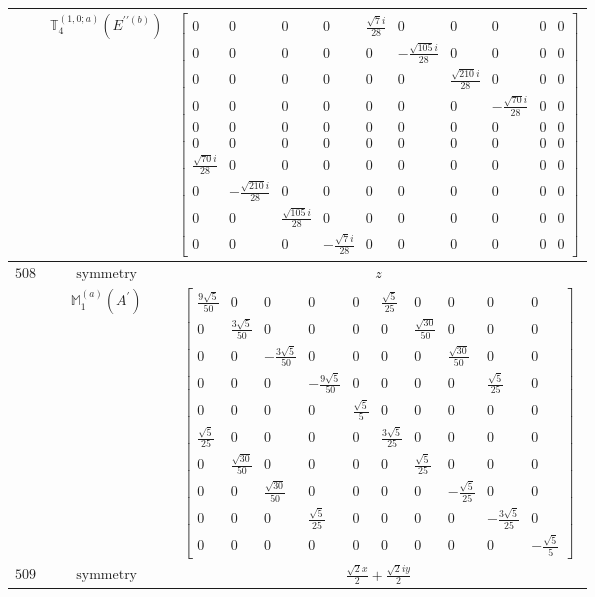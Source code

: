 \documentclass[fleqn,8pt,landscape]{jsarticle}
\begin{document}
\begin{longtable}{ccc}
$  $ & $ \mathbb{T}_{4}^{(1,0;a)}(E^{\prime\prime(b)}) $ & $ \begin{bmatrix} 0 & 0 & 0 & 0 & \frac{\sqrt{7} i}{28} & 0 & 0 & 0 & 0 & 0 \\ 0 & 0 & 0 & 0 & 0 & - \frac{\sqrt{105} i}{28} & 0 & 0 & 0 & 0 \\ 0 & 0 & 0 & 0 & 0 & 0 & \frac{\sqrt{210} i}{28} & 0 & 0 & 0 \\ 0 & 0 & 0 & 0 & 0 & 0 & 0 & - \frac{\sqrt{70} i}{28} & 0 & 0 \\ 0 & 0 & 0 & 0 & 0 & 0 & 0 & 0 & 0 & 0 \\ 0 & 0 & 0 & 0 & 0 & 0 & 0 & 0 & 0 & 0 \\ \frac{\sqrt{70} i}{28} & 0 & 0 & 0 & 0 & 0 & 0 & 0 & 0 & 0 \\ 0 & - \frac{\sqrt{210} i}{28} & 0 & 0 & 0 & 0 & 0 & 0 & 0 & 0 \\ 0 & 0 & \frac{\sqrt{105} i}{28} & 0 & 0 & 0 & 0 & 0 & 0 & 0 \\ 0 & 0 & 0 & - \frac{\sqrt{7} i}{28} & 0 & 0 & 0 & 0 & 0 & 0 \end{bmatrix} $ \\ \hline
$ 508 $ & $ \text{symmetry} $ & $ z $ \\
$  $ & $ \mathbb{M}_{1}^{(a)}(A^{\prime}) $ & $ \begin{bmatrix} \frac{9 \sqrt{5}}{50} & 0 & 0 & 0 & 0 & \frac{\sqrt{5}}{25} & 0 & 0 & 0 & 0 \\ 0 & \frac{3 \sqrt{5}}{50} & 0 & 0 & 0 & 0 & \frac{\sqrt{30}}{50} & 0 & 0 & 0 \\ 0 & 0 & - \frac{3 \sqrt{5}}{50} & 0 & 0 & 0 & 0 & \frac{\sqrt{30}}{50} & 0 & 0 \\ 0 & 0 & 0 & - \frac{9 \sqrt{5}}{50} & 0 & 0 & 0 & 0 & \frac{\sqrt{5}}{25} & 0 \\ 0 & 0 & 0 & 0 & \frac{\sqrt{5}}{5} & 0 & 0 & 0 & 0 & 0 \\ \frac{\sqrt{5}}{25} & 0 & 0 & 0 & 0 & \frac{3 \sqrt{5}}{25} & 0 & 0 & 0 & 0 \\ 0 & \frac{\sqrt{30}}{50} & 0 & 0 & 0 & 0 & \frac{\sqrt{5}}{25} & 0 & 0 & 0 \\ 0 & 0 & \frac{\sqrt{30}}{50} & 0 & 0 & 0 & 0 & - \frac{\sqrt{5}}{25} & 0 & 0 \\ 0 & 0 & 0 & \frac{\sqrt{5}}{25} & 0 & 0 & 0 & 0 & - \frac{3 \sqrt{5}}{25} & 0 \\ 0 & 0 & 0 & 0 & 0 & 0 & 0 & 0 & 0 & - \frac{\sqrt{5}}{5} \end{bmatrix} $ \\ \hline
$ 509 $ & $ \text{symmetry} $ & $ \frac{\sqrt{2} x}{2} + \frac{\sqrt{2} i y}{2} $ \\

\end{longtable}
\end{document}
